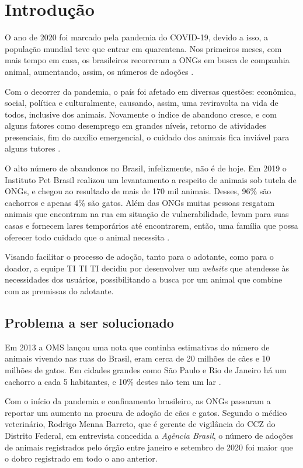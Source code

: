 \chapter[Introdução]{Introdução}
O ano de 2020 foi marcado pela pandemia do \gls{COVID-19}, devido a isso, a população mundial teve que entrar em quarentena. Nos primeiros meses, com mais tempo em casa, os brasileiros recorreram a \ac{ONGs} em busca de companhia animal, aumentando, assim, os números de adoções \cite{adocao}.

Com o decorrer da pandemia, o país foi afetado em diversas questões: econômica, social, política e culturalmente, causando, assim, uma reviravolta na vida de todos, inclusive dos animais. Novamente o índice de abandono cresce, e com alguns fatores como desemprego em grandes níveis, retorno de atividades presenciais, fim do auxílio emergencial, o cuidado dos animais fica inviável para alguns tutores \cite{abandono_pandemia}.

O alto número de abandonos no Brasil, infelizmente, não é de hoje. Em 2019 o Instituto Pet Brasil realizou um levantamento a respeito de animais sob tutela de \ac{ONGs}, e chegou ao resultado de mais de 170 mil animais. Desses, 96\% são cachorros e apenas 4\% são gatos. Além das \ac{ONGs} muitas pessoas resgatam animais que encontram na rua em situação de vulnerabilidade, levam para suas casas e fornecem lares temporários até encontrarem, então, uma família que possa oferecer todo cuidado que o animal necessita \cite{tutelaONG}.

Visando facilitar o processo de adoção, tanto para o adotante, como para o doador, a equipe TI TI TI decidiu por desenvolver um \textit{website} que atendesse às necessidades dos usuários, possibilitando a busca por um animal que combine com as premissas do adotante.

\section{Problema a ser solucionado}
Em 2013 a \ac{OMS} lançou uma nota que continha estimativas do número de animais vivendo nas ruas do Brasil, eram cerca de 20 milhões de cães e 10 milhões de gatos. Em cidades grandes como São Paulo e Rio de Janeiro há um cachorro a cada 5 habitantes, e 10\% destes não tem um lar \cite{Problema}.



Com o início da pandemia e confinamento brasileiro, as \ac{ONGs} passaram a reportar um aumento na procura de adoção de cães e gatos. Segundo o médico veterinário, Rodrigo Menna Barreto, que é gerente de vigilância do \ac{CCZ} do Distrito Federal, em entrevista concedida a \textit{Agência Brasil}, o número de adoções de animais registrados pelo órgão entre janeiro e setembro de 2020 foi maior que o dobro registrado em todo o ano anterior.



